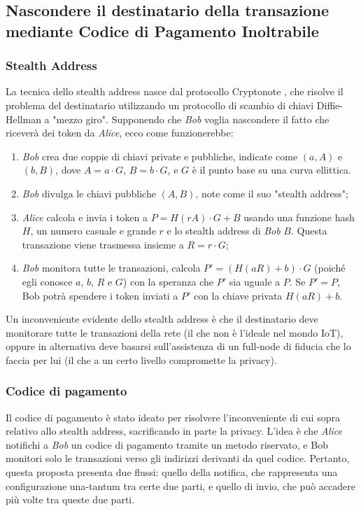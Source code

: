 \subsection{Nascondere il destinatario della transazione mediante Codice di Pagamento Inoltrabile}

\subsubsection{Stealth Address}
La tecnica dello stealth address nasce dal protocollo Cryptonote \cite{c28}, che risolve il problema del destinatario utilizzando un protocollo di scambio di chiavi Diffie-Hellman a "mezzo giro". Supponendo che \emph{Bob} voglia nascondere il fatto che riceverà dei token da \emph{Alice}, ecco come funzionerebbe:

\begin{enumerate}
	\item \emph{Bob} crea due coppie di chiavi private e pubbliche, indicate come $(a, A)$ e $(b, B)$, dove $A = a\cdot G$, $B = b\cdot G$, e $G$ è il punto base su una curva ellittica.

	\item \emph{Bob} divulga le chiavi pubbliche $(A, B)$, note come il suo "stealth address";

	\item \emph{Alice} calcola e invia i token a $P = H (rA)\cdot G + B$ usando una funzione hash $H$, un numero casuale e grande $r$  e lo stealth address di \emph{Bob} $B$. Questa transazione viene trasmessa insieme a $R = r\cdot G$;
	\item  \emph{Bob} monitora tutte le transazioni, calcola $P' = (H(aR) + b)\cdot G$ (poiché egli conosce $a$, $b$, $R$ e $G$) con la speranza che $P'$ sia uguale a $P$. Se $P' = P$, Bob potrà spendere i token inviati a $P'$ con la chiave privata $H(aR) + b$.
\end{enumerate}

Un inconveniente evidente dello stealth address è che il destinatario deve monitorare tutte le transazioni della rete (il che non è l'ideale nel mondo IoT), oppure in alternativa deve basarsi sull'assistenza di un full-node di fiducia che lo faccia per lui (il che a un certo livello compromette la privacy).

\subsubsection{Codice di pagamento}
Il codice di pagamento è stato ideato per risolvere l'inconveniente di cui sopra relativo allo stealth address, sacrificando in parte la privacy. L'idea è che \emph{Alice} notifichi a \emph{Bob} un codice di pagamento tramite un metodo riservato, e Bob monitori solo le transazioni verso gli indirizzi derivanti da quel codice. Pertanto, questa proposta presenta due flussi: quello della notifica, che rappresenta una configurazione una-tantum tra certe due parti, e quello di invio, che può accadere più volte tra queste due parti.

